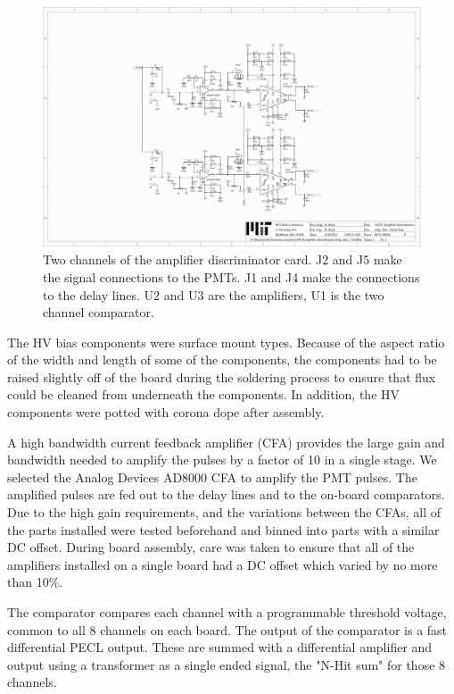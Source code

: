 \documentclass[review,number,sort&compress]{elsarticle}
\begin{document}
\begin{figure}[ht]
\begin{center}
\includegraphics[width=5.5in, keepaspectratio=true, trim=4.54in 2.12in 4.54in 2.12in, clip=true]{graphics/veto_sch.pdf}
\caption{Two channels of the amplifier discriminator card. J2 and J5 make the signal connections to the PMTs. J1 and J4 make the connections to the delay lines. U2 and U3 are the amplifiers, U1 is the two channel comparator.
\label{fig:ampdiscsch}}
\end{center}
\end{figure}

The HV bias components were surface mount types. Because of the
aspect ratio of the width and length of some of the components, the
components had to be raised slightly off of the board during the
soldering process to ensure that flux could be cleaned from underneath
the components. In addition, the HV components were potted with
corona dope after assembly.

A high bandwidth current feedback amplifier (CFA) provides the large
gain and bandwidth needed to amplify the pulses by a factor of 10 in a
single stage. We selected the Analog Devices AD8000 CFA to amplify
the PMT pulses. The amplified pulses are fed out to the delay
lines and to the on-board comparators. Due to the high gain
requirements, and the variations between the CFAs, all of the parts
installed were tested beforehand and binned into parts with a similar
DC offset. During board assembly, care was taken to ensure that all
of the amplifiers installed on a single board had a DC offset which varied by no more than 10\%.

The comparator compares each channel with a programmable threshold
voltage, common to all 8 channels on each board. The output of the
comparator is a fast differential PECL output. These are summed with
a differential amplifier and output using a transformer as a single
ended signal, the "N-Hit sum" for those 8 channels.
\end{document}
